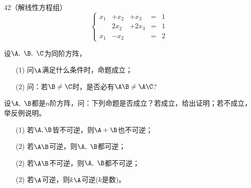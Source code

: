 \begin{frame}
  \begin{footnotesize}
    \begin{exampleblock}{42（解线性方程组）}     
      $$
      \left\{
      \begin{array}{rrrcr}
        x_1&+x_2&+x_3&=&1\\
           &2x_2&+2x_3&=&1\\
        x_1&-x_2&&=&2
      \end{array}
      \right.
      $$
    \end{exampleblock}
  \end{footnotesize}
\end{frame}



\begin{frame}
  \begin{footnotesize}
    \begin{exampleblock}{43}
      设$\A,~\B,~\C$为同阶方阵，
      \begin{itemize}
      \item[(1)]问$\A$满足什么条件时，命题\blue{$\A\B=\A\C~\Rightarrow~\B=\C$}成立；\\[0.05in]
      \item[(2)] 问：若$\B\ne\C$时，是否必有$\A\B\ne\A\C$?
      \end{itemize}
    \end{exampleblock}
  \end{footnotesize}
\end{frame}


\begin{frame}
  \begin{footnotesize}
    \begin{exampleblock}{44}
      设$\A,~\B$都是$n$阶方阵，问：下列命题是否成立？若成立，给出证明；若不成立，举反例说明。
      \begin{itemize}
      \item[(1)]若$\A,\B$皆不可逆，则$\A+\B$也不可逆；
      \item[(2)]若$\A\B$可逆，则$\A,~\B$都可逆；
      \item[(2)]若$\A\B$不可逆，则$\A,~\B$都不可逆；
      \item[(2)]若$\A$可逆，则$k\A$可逆($k$是数)。
      \end{itemize}
    \end{exampleblock}
  \end{footnotesize}
\end{frame}



